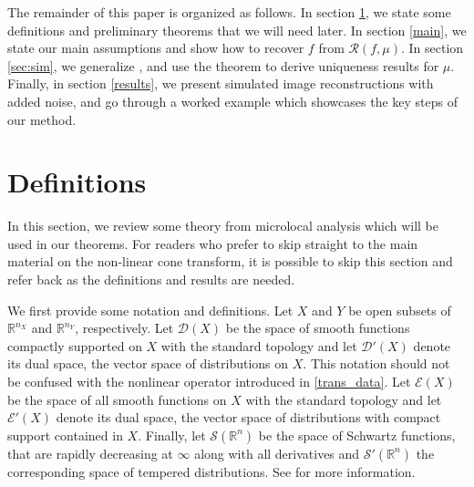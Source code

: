 \documentclass[a4paper,12pt]{amsart}
\numberwithin{equation}{section}
\theoremstyle{plain}
\numberwithin{theorem}{section}
\theoremstyle{definition}
\theoremstyle{remark}
\theoremstyle{remark}
\theoremstyle{remark}
\newcommand{\Dc}{\mathcal{D}}
\newcommand{\Ec}{\mathcal{E}}
\newcommand{\Sc}{\mathcal{S}}
\newcommand{\rn}{{{\mathbb R}^n}}
\newcommand{\intt}{{\operatorname{int}}}
\begin{document}
The remainder of this paper is organized as follows. In section \ref{sect:defns}, we state some definitions and preliminary theorems that we will need later. In section \ref{main}, we state our main assumptions and show how to recover $f$ from $\mathcal{R}(f,\mu)$. In section \ref{sec:sim}, we generalize \cite[Theorem 3.3]{natterer}, and use the theorem to derive uniqueness results for $\mu$. Finally, in section \ref{results}, we present simulated image reconstructions with added noise, and go through a worked example which showcases the key steps of our method.


\section{Definitions}\label{sect:defns} 

In this section, we review some theory from microlocal analysis which will be used in our theorems. For readers who prefer to skip straight to the main material on the non-linear cone transform, it is possible to skip this section and refer back as the definitions and results are needed.

We first provide some
notation and definitions.  Let $X$ and $Y$ be open subsets of
{$\mathbb{R}^{n_X}$ and $\mathbb{R}^{n_Y}$, respectively.}  Let $\Dc(X)$ be the space of smooth functions compactly
supported on $X$ with the standard topology and let $\mathcal{D}'(X)$
denote its dual space, the vector space of distributions on $X$. This notation should not be confused with the nonlinear operator introduced in \eqref{trans_data}. Let
$\Ec(X)$ be the space of all smooth functions on $X$ with the standard
topology and let $\mathcal{E}'(X)$ denote its dual space, the vector
space of distributions with compact support contained in $X$. Finally,
let $\Sc(\rn)$ be the space of Schwartz functions, that are rapidly
decreasing at $\infty$ along with all derivatives and $\mathcal{S}'(\mathbb{R}^n)$ the corresponding space of tempered distributions. See \cite{Rudin:FA}
for more information. 

\end{document}
